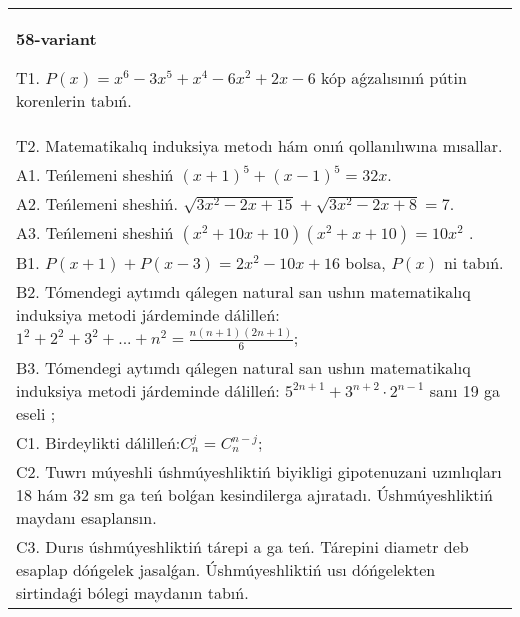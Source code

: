 \documentclass{article}
\begin{document}
\begin{tabular}{m{17cm}}
\textbf{58-variant}
\newline

T1. \(P(x) = x^{6} - 3x^{5} + x^{4} - 6x^{2} + 2x - 6\) kóp aǵzalısınıń pútin korenlerin tabıń. \\
T2. Matematikalıq induksiya metodı hám onıń qollanılıwına mısallar. \\
A1. Teńlemeni sheshiń \((x + 1)^{5} + (x - 1)^{5} = 32x\). \\
A2. Teńlemeni sheshiń. \(\sqrt{3x^{2} - 2x + 15} + \sqrt{3x^{2} - 2x + 8} = 7\). \\
A3. Teńlemeni sheshiń \(\left( x^{2} + 10x + 10 \right)\left( x^{2} + x + 10 \right) = 10x^{2}\) . \\
B1. \(P(x + 1) + P(x - 3) = 2x^{2} - 10x + 16\) bolsa, \(P(x)\) ni tabıń. \\
B2. Tómendegi aytımdı qálegen natural san ushın matematikalıq induksiya metodi járdeminde dálilleń: \(1^{2} + 2^{2} + 3^{2} + ... + n^{2} = \frac{n(n + 1)(2n + 1)}{6}\); \\
B3. Tómendegi aytımdı qálegen natural san ushın matematikalıq induksiya metodi járdeminde dálilleń: \(5^{2n + 1} + 3^{n + 2} \cdot 2^{n - 1}\) sanı 19 ga eseli ; \\
C1. Birdeylikti dálilleń:\(C_{n}^{j} = C_{n}^{n - j}\); \\
C2. Tuwrı múyeshli úshmúyeshliktiń biyikligi gipotenuzani uzınlıqları 18 hám 32 sm ga teń bolǵan kesindilerga ajıratadı. Úshmúyeshliktiń maydanı esaplansın. \\
C3. Durıs úshmúyeshliktiń tárepi a ga teń. Tárepini diametr deb esaplap dóńgelek jasalǵan. Úshmúyeshliktiń usı dóńgelekten sirtindaǵi bólegi maydanın tabıń. \\

\end{tabular}
\vspace{1cm}
\end{document}
